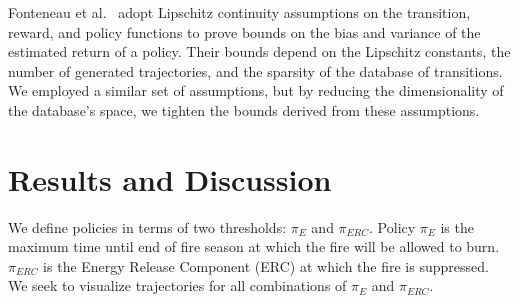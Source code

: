 \documentclass{article}
\begin{document}
Fonteneau et al.~\cite{Fonteneau2010c} adopt Lipschitz continuity assumptions on the
transition, reward, and policy functions to prove bounds on the
bias and variance of the estimated return of a policy. Their bounds depend on
the Lipschitz constants, the number of generated trajectories,
and the sparsity of the database of transitions.
We employed a similar set of assumptions,
but by reducing the dimensionality of the database's space,
we tighten the bounds derived from these assumptions.

\section{Results and Discussion}

We define policies in terms of two thresholds: $\pi_E$ and $\pi_{ERC}$.
Policy $\pi_E$ is the maximum time until end of fire season at which
the fire will be allowed to burn.
$\pi_{ERC}$ is the Energy Release Component (ERC) at which the
fire is suppressed.
We seek to visualize trajectories for
all combinations of $\pi_E$ and $\pi_{ERC}$.
\end{document}

